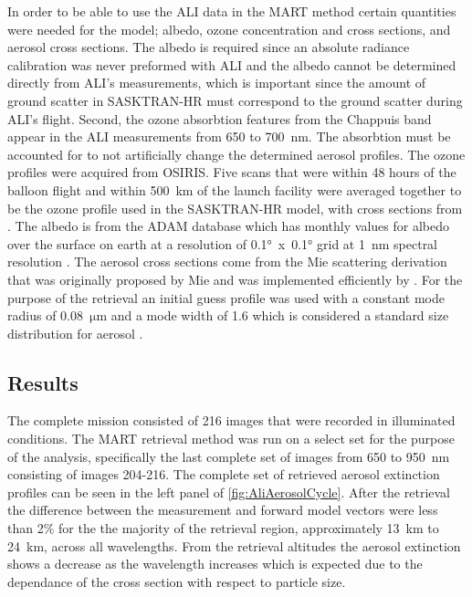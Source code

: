 \documentclass[12pt]{article}
\begin{document}
In order to be able to use the ALI data in the MART method certain quantities were needed for the model; albedo, ozone concentration and cross sections, and aerosol cross sections. The albedo is required since an absolute radiance calibration was never preformed with ALI and the albedo cannot be determined directly from ALI's measurements, which is important since the amount of ground scatter in SASKTRAN-HR must correspond to the ground scatter during ALI's flight. Second, the ozone absorbtion features from the Chappuis band appear in the ALI measurements from 650 to 700~nm. The absorbtion must be accounted for to not artificially change the determined aerosol profiles. The ozone profiles were acquired from OSIRIS. Five scans that were within 48 hours of the balloon flight and within 500~km of the launch facility were averaged together to be the ozone profile used in the SASKTRAN-HR model, with cross sections from \cite{Burrows1999}. The albedo is from the ADAM database which has monthly values for albedo over the surface on earth at a resolution of 0.1\si{\degree}~x~0.1\si{\degree} grid at 1~nm spectral resolution \citep{Muller2013}. The aerosol cross sections come from the Mie scattering derivation that was originally proposed by Mie and was implemented efficiently by \cite{Wiscombe1980}. For the purpose of the retrieval an initial guess profile was used with a constant mode radius of 0.08~$\si{\micro\metre}$  and a mode width of 1.6 which is considered a standard size distribution for aerosol \citep{Deshler2003}.

\subsection{Results}

The complete mission consisted of 216 images that were recorded in illuminated conditions. The MART retrieval method was run on a select set for the purpose of the analysis, specifically the last complete set of images from 650 to 950~nm consisting of images 204-216. The complete set of retrieved aerosol extinction profiles can be seen in the left panel of \autoref{fig:AliAerosolCycle}. After the retrieval the difference between the measurement and forward model vectors were less than 2\% for the the majority of the retrieval region, approximately 13~km to 24~km, across all wavelengths. From the retrieval altitudes the aerosol extinction shows a decrease as the wavelength increases which is expected due to the dependance of the cross section with respect to particle size.
\end{document}
